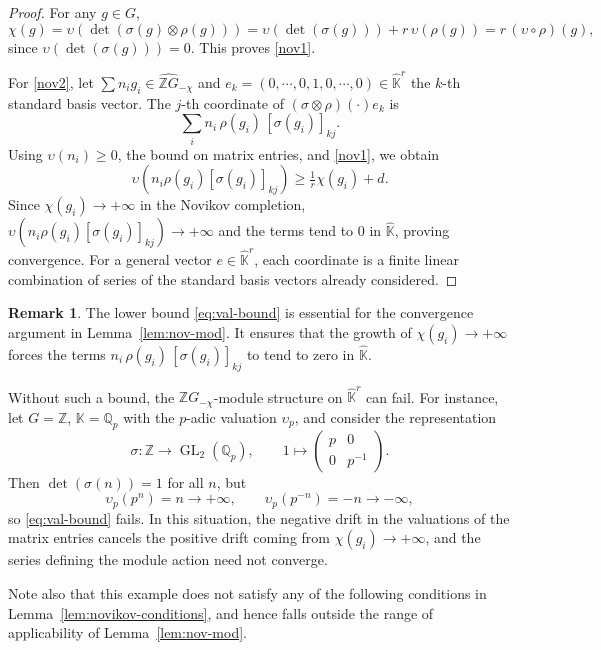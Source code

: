 \documentclass[11pt]{amsart}
\theoremstyle{definition}
\newtheorem{remark}[theorem]{Remark}
\newcommand{\Z}{\mathbb{Z}}
\newcommand{\Q}{\mathbb{Q}}
\newcommand{\K}{\mathbb{K}}
\DeclareMathOperator{\GL}{GL}
\begin{document}
\begin{proof}
For any $g\in G$,
\[
\chi(g)
= \upsilon(\det(\sigma(g)\otimes \rho(g)))
= \upsilon(\det(\sigma(g))) + r\,\upsilon(\rho(g))
= r\,(\upsilon\circ \rho)(g),
\]
since $\upsilon(\det(\sigma(g)))=0$. This proves \eqref{nov1}.

For \eqref{nov2}, let $\sum n_i g_i \in \widehat{\Z G}_{-\chi}$ and 
$e_k=(0,\cdots, 0, 1, 0,\cdots, 0)\in \hat{\K}^r$ the $k$-th standard basis vector. 
The $j$-th coordinate of $(\sigma\otimes\rho)(\cdot)e_k$ is
\[
\sum_i n_i\,\rho(g_i)\,[\sigma(g_i)]_{kj}.
\]
Using $\upsilon(n_i)\ge 0$, the bound on matrix entries, and \eqref{nov1}, we obtain
\[
\upsilon(n_i\rho(g_i)[\sigma(g_i)]_{kj})
\ge \tfrac{1}{r}\chi(g_i)+d.
\]
Since $\chi(g_i)\to +\infty$ in the Novikov completion, 
$\upsilon(n_i\rho(g_i)[\sigma(g_i)]_{kj}) \to +\infty$ and the terms tend to $0$
in $\hat{\K}$, proving convergence. For a general vector $e\in \hat{\K}^r$, 
each coordinate is a finite linear combination of series of the standard 
basis vectors already considered.
\end{proof}

\begin{remark}
\label{rem:val-bound}
The lower bound \eqref{eq:val-bound} is essential for the convergence
argument in Lemma~\ref{lem:nov-mod}. It ensures that the growth of
$\chi(g_i)\to +\infty$ forces the terms $n_i\,\rho(g_i)\,[\sigma(g_i)]_{kj}$ 
to tend to zero in $\hat{\K}$.

Without such a bound, the $\widehat{\Z G}_{-\chi}$-module structure on
$\hat{\K}^r$ can fail. For instance, let $G=\Z$, $\K=\Q_p$ with the $p$-adic
valuation $\upsilon_p$, and consider the representation
\[
\sigma\colon \Z\to \GL_2(\Q_p), \qquad
1\mapsto
\begin{pmatrix}
p & 0 \\
0 & p^{-1}
\end{pmatrix}.
\]
Then $\det(\sigma(n))=1$ for all $n$, but
\[
\upsilon_p(p^n)=n \to +\infty,
\qquad
\upsilon_p(p^{-n})=-n \to -\infty,
\]
so \eqref{eq:val-bound} fails. In this situation, the negative drift in the
valuations of the matrix entries cancels the positive drift coming from
$\chi(g_i)\to +\infty$, and the series defining the module action need not
converge.

Note also that this example does not satisfy any of the following conditions in
Lemma~\ref{lem:novikov-conditions}, and hence falls outside the
range of applicability of Lemma~\ref{lem:nov-mod}.
\end{remark}
\end{document}

